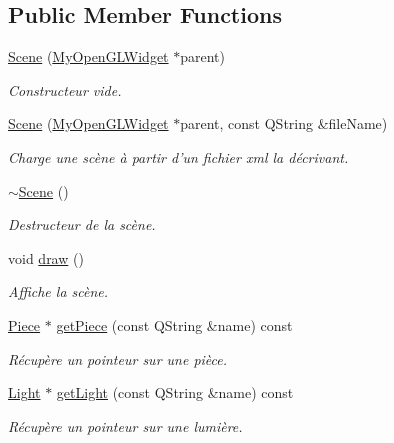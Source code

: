 \subsection*{Public Member Functions}
\begin{DoxyCompactItemize}
\item 
\hyperlink{class_scene_a3c45f1dd8cd92ade623deca326197931}{Scene} (\hyperlink{class_my_open_g_l_widget}{My\+Open\+G\+L\+Widget} $\ast$parent)
\begin{DoxyCompactList}\small\item\em Constructeur vide. \end{DoxyCompactList}\item 
\hyperlink{class_scene_a2490795fc196c0e9f9196d18d4c6cfe0}{Scene} (\hyperlink{class_my_open_g_l_widget}{My\+Open\+G\+L\+Widget} $\ast$parent, const Q\+String \&file\+Name)
\begin{DoxyCompactList}\small\item\em Charge une scène à partir d'un fichier xml la décrivant. \end{DoxyCompactList}\item 
\hyperlink{class_scene_a3b8cec2e32546713915f8c6303c951f1}{$\sim$\+Scene} ()
\begin{DoxyCompactList}\small\item\em Destructeur de la scène. \end{DoxyCompactList}\item 
void \hyperlink{class_scene_ac0e3d2c98ba6063a086467fb2c19142f}{draw} ()
\begin{DoxyCompactList}\small\item\em Affiche la scène. \end{DoxyCompactList}\item 
\hyperlink{class_piece}{Piece} $\ast$ \hyperlink{class_scene_ae2060bd6c44231ffe7f6f0a3447325f1}{get\+Piece} (const Q\+String \&name) const 
\begin{DoxyCompactList}\small\item\em Récupère un pointeur sur une pièce. \end{DoxyCompactList}\item 
\hyperlink{class_light}{Light} $\ast$ \hyperlink{class_scene_a4f35ca9d308ef5563d9f205904eedbb8}{get\+Light} (const Q\+String \&name) const 
\begin{DoxyCompactList}\small\item\em Récupère un pointeur sur une lumière. \end{DoxyCompactList}\item 

\end{DoxyCompactItemize}
